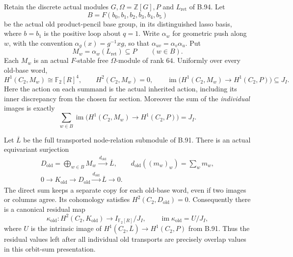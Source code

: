 \label{stmt:B96}
Retain the discrete actual modules $G,\Omega=\mathbb Z[G],P$ and
$L_{\mathrm{ret}}$ of B.94.  Let
\[
 B=F(b_0,b_1,b_2,b_3,b_4,b_5)
\]
be the actual old product-pencil base group, in its distinguished
lasso basis, where $b=b_1$ is the positive loop about $q=1$.
Write $\alpha_w$ for geometric push along $w$, with the convention
$\alpha_g(x)=g^{-1}xg$, so that
$\alpha_{uv}=\alpha_v\alpha_u$.  Put
\[
 M_w=\alpha_w(L_{\mathrm{ret}})\subseteq P\qquad(w\in B).
\]
Each $M_w$ is an actual $F$-stable free $\Omega$-module of rank $64$.
Uniformly over every old-base word,
\begin{equation}\label{eq:B96-individual}
 H^1(C_2,M_w)\cong\mathbb F_2[R]^4,
 \qquad H^2(C_2,M_w)=0,
 \qquad
 \operatorname{im}\bigl(H^1(C_2,M_w)\longrightarrow H^1(C_2,P)\bigr)
       \subseteq J_I.
\end{equation}
Here the action on each summand is the actual inherited action,
including its inner discrepancy from the chosen far section.
Moreover the sum of the \emph{individual} images is exactly
\begin{equation}\label{eq:B96-sum-individual}
 \sum_{w\in B}
 \operatorname{im}\bigl(H^1(C_2,M_w)\longrightarrow H^1(C_2,P)\bigr)
                   =J_I.
\end{equation}

Let $\overline L$ be the full transported node-relation submodule
of B.91.  There is an actual equivariant surjection
\begin{equation}\label{eq:B96-orbit-sequence}
 \begin{gathered}
 D_{\mathrm{old}}=\bigoplus_{w\in B}M_w
       \xrightarrow{\ d_{\mathrm{old}}\ }\overline L,\qquad
       d_{\mathrm{old}}((m_w)_w)=\sum_wm_w,\\
 0\longrightarrow K_{\mathrm{old}}\longrightarrow
 D_{\mathrm{old}}\xrightarrow{d_{\mathrm{old}}}\overline L
 \longrightarrow0.
 \end{gathered}
\end{equation}
The direct sum keeps a separate copy for each old-base word, even
if two images or columns agree.  Its cohomology satisfies
$H^2(C_2,D_{\mathrm{old}})=0$.  Consequently there is a canonical
residual map
\begin{equation}\label{eq:B96-residual}
 \kappa_{\mathrm{old}}:H^2(C_2,K_{\mathrm{old}})
       \longrightarrow I_{\mathbb F_2[R]}/J_I,
 \qquad
 \operatorname{im}\kappa_{\mathrm{old}}=U/J_I,
\end{equation}
where $U$ is the intrinsic image of
$H^1(C_2,\overline L)\to H^1(C_2,P)$ from B.91.
Thus the residual values left after all individual old transports
are precisely overlap values in this orbit-sum presentation.

